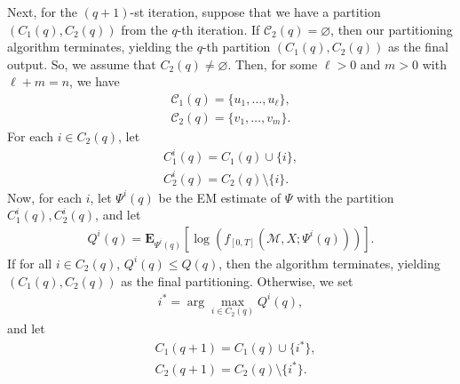 \documentclass[12pt]{article}%
\begin{document}
Next, for the $(q+1)$-st iteration, suppose that we have a partition $(C_1(q), C_2(q))$ from the $q$-th iteration. If $\mathcal C_2(q) = \varnothing$, then our partitioning algorithm terminates, yielding the $q$-th partition $(C_1(q), C_2(q))$ as the final output.  So, we assume that $C_2(q)\neq \varnothing$.  Then, for some $\ell > 0$ and $m > 0$ with $\ell + m = n$, we have 
\begin{eqnarray}
\mathcal C_1(q) = \{u_1,\ldots, u_\ell\},\\
\mathcal C_2(q) = \{v_1,\ldots, v_m\}.
\end{eqnarray} 
For each $i \in C_2(q)$, let 
\begin{eqnarray}
C_1^{i}(q) = C_1(q) \cup \{i\}, \\
C_2^{i}(q) = C_2(q) \setminus \{i\}.
\end{eqnarray}
Now, for each $i$, let $\Psi^{i}(q)$ be the EM estimate of $\Psi$ with the partition $C_1^{i}(q), C_2^{i}(q)$, and let 
\begin{eqnarray}
Q^{i}(q) = \mathbf E_{\Psi^{i}(q)}\left[\log(f_{[0,T]}(\mathcal M,X;\Psi^{i}(q)))\right].
\end{eqnarray}
If for all $i \in C_2(q)$, $Q^{i}(q) \le Q(q)$, then the algorithm terminates, yielding 
$(C_1(q), C_2(q))$ as the final partitioning.  Otherwise, we set 
\begin{eqnarray}
i^* = \arg\max_{i \in C_2(q)} Q^{i}(q),
\end{eqnarray}
and let 
\begin{eqnarray}
&C_1(q+1) = C_1(q) \cup \{i^*\},\\
&C_2(q+1) = C_2(q) \setminus \{i^*\}.
\end{eqnarray}
\end{document}
